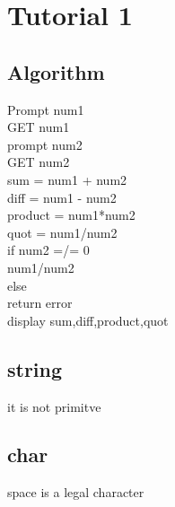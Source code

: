 \documentclass[12pt]{article}
\begin{document}
\section{Tutorial 1}
\subsection{Algorithm}
Prompt num1 \\
GET num1 \\
prompt num2 \\
GET num2 \\
sum = num1 + num2 \\ 
diff = num1 - num2 \\
product = num1*num2 \\
quot = num1/num2 \\
if num2 =/= 0 \\
    num1/num2 \\
else \\
return error \\
display sum,diff,product,quot \\
\subsection{string}
it is not primitve
\subsection{char}
space is a legal character
\end{document}
